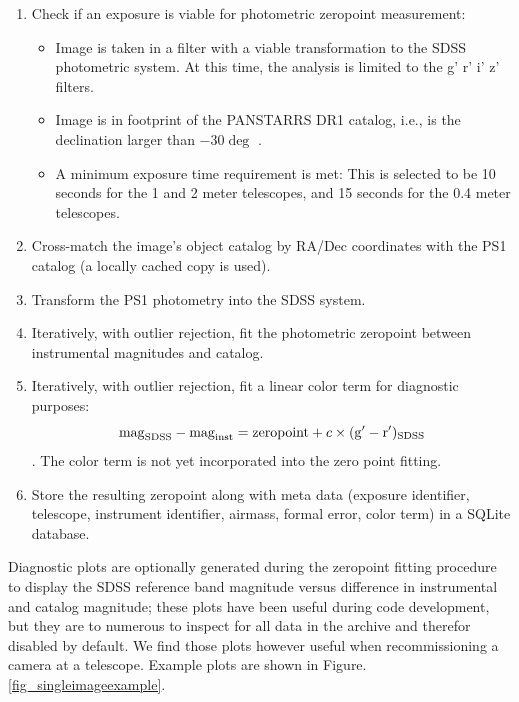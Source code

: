 \documentclass[]{spieman}
\begin{document}
 
\begin{enumerate} 
    \item Check if an exposure is viable for photometric zeropoint measurement:
   
    \begin{itemize} 
        \item Image is taken in a filter with a viable transformation to the SDSS
        photometric system. At this time, the analysis is limited to the g' r' i' z' filters. 
        
        \item Image is in footprint of the PANSTARRS DR1 catalog, i.e., is the declination larger
         than $-30\deg$ . 
        
        \item A minimum exposure time requirement is met: This is selected to be 10 seconds for the
         1 and 2 meter telescopes, and 15 seconds for the 0.4 meter telescopes. 
        
    \end{itemize}
    
    \item Cross-match the image's object catalog by RA/Dec coordinates with the PS1 catalog (a 
    locally cached copy is used). 
    
    \item Transform the PS1 photometry into the SDSS system\cite{finkbeiner2016}.
    
    \item Iteratively, with outlier rejection, fit the photometric zeropoint between instrumental
    magnitudes and catalog. \item Iteratively, with outlier rejection, fit a linear color term for
    diagnostic purposes: $$ {\rm mag}_{\rm SDSS} - {\rm mag}_{\rm inst} = {\rm zeropoint} + c \times
    ({\rm g'}-{ \rm r'})_{\rm SDSS}$$. The color term is not yet incorporated into the zero point
    fitting. \item Store the resulting zeropoint along with meta data (exposure identifier, 
    telescope, instrument identifier, airmass, formal error, color term) in a SQLite database. 
\end{enumerate}

Diagnostic plots are optionally generated during the zeropoint fitting procedure to display the
SDSS reference band magnitude versus difference in instrumental and catalog magnitude; these plots
have been useful during code development, but they are to numerous to inspect for all data in the
archive and therefor disabled by default. We find those plots however useful when recommissioning a
camera at a telescope. Example plots are shown in Figure.\ref{fig_singleimageexample}.
\end{document}
